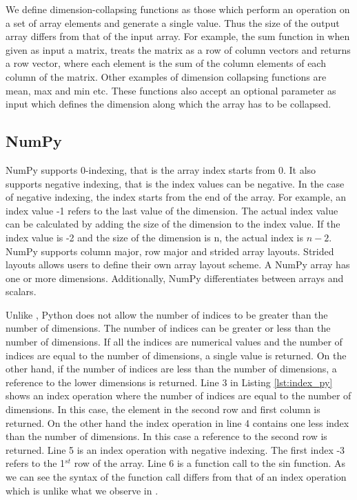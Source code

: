 We define dimension-collapsing functions as those which perform an operation on a set of array elements and generate a single value. Thus the size of the output array differs from that of the input array. For example, the \textsf{sum} function in \matlab when given as input a matrix, treats the matrix as a row of column vectors and returns a row vector, where each element is the sum of the column elements of each column of the matrix. Other examples of dimension collapsing functions are \textsf{mean}, \textsf{max} and \textsf{min} etc. These functions also accept an optional parameter as input which defines the dimension along which the array has to be collapsed. 
\subsection{NumPy}
NumPy supports 0-indexing, that is the array index starts from 0. It also supports negative indexing, that is the index values can be negative. In the case of negative indexing, the index starts from the end of the array. For example, an index value \textsf{-1} refers to the last value of the dimension. The actual index value can be calculated by adding the size of the dimension to the index value. If the index value is -2 and the size of the dimension is n, the actual index is $n - 2$. NumPy supports column major, row major and strided array layouts. Strided layouts allows users to define their own array layout scheme. A NumPy array has one or more dimensions. Additionally, NumPy differentiates between arrays and scalars.

Unlike \matlab, Python does not allow the number of indices to be greater than the number of dimensions. The number of indices can be greater or less than the number of dimensions. If all the indices are numerical values and the number of indices are equal to the number of dimensions, a single value is returned. On the other hand, if the number of indices are less than the number of dimensions, a reference to the lower dimensions is returned. Line 3 in Listing \ref{lst:index_py} shows an index operation where the number of indices are equal to the number of dimensions. In this case, the element in the second row and first column is returned. On the other hand the index operation in line 4 contains one less index than the number of dimensions. In this case a reference to the second row is returned. Line 5 is an index operation with negative indexing. The first index -3 refers to the 1$^{st}$ row of the array.  Line 6 is a function call to the sin function. As we can see the syntax of the function call differs from that of an index operation which is unlike what we observe in \matlab. 

